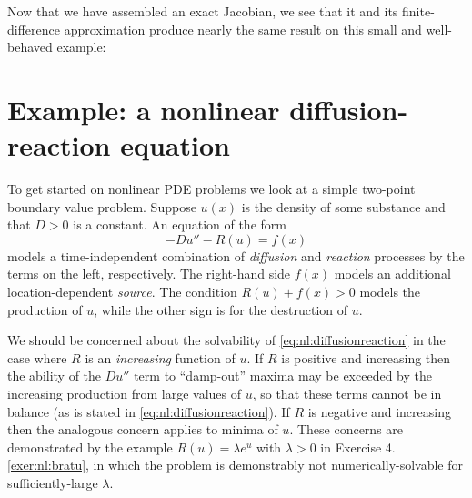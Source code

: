 Now that we have assembled an exact Jacobian, we see that it and its finite-difference approximation produce nearly the same result on this small and well-behaved example:


\section{Example: a nonlinear diffusion-reaction equation}

To get started on nonlinear PDE problems we look at a simple two-point boundary value problem.  Suppose $u(x)$ is the density of some substance and that $D>0$ is a constant.  An equation of the form
\begin{equation}
- D u'' - R(u) = f(x)  \label{eq:nl:diffusionreaction}
\end{equation}
models a time-independent combination of \emph{diffusion} and \emph{reaction} processes by the terms on the left, respectively.  The right-hand side $f(x)$ models an additional location-dependent \emph{source}.  The condition $R(u)+f(x)>0$ models the production of $u$, while the other sign is for the destruction of $u$.

We should be concerned about the solvability of \eqref{eq:nl:diffusionreaction} in the case where $R$ is an \emph{increasing} function of $u$.  If $R$ is positive and increasing then the ability of the $D u''$ term to ``damp-out'' maxima may be exceeded by the increasing production from large values of $u$, so that these terms cannot be in balance (as is stated in \eqref{eq:nl:diffusionreaction}).  If $R$ is negative and increasing then the analogous concern applies to minima of $u$.  These concerns are demonstrated by the example $R(u) = \lambda e^u$ with $\lambda>0$ in Exercise 4.\ref{exer:nl:bratu}, in which the problem is demonstrably not numerically-solvable for sufficiently-large $\lambda$.  

